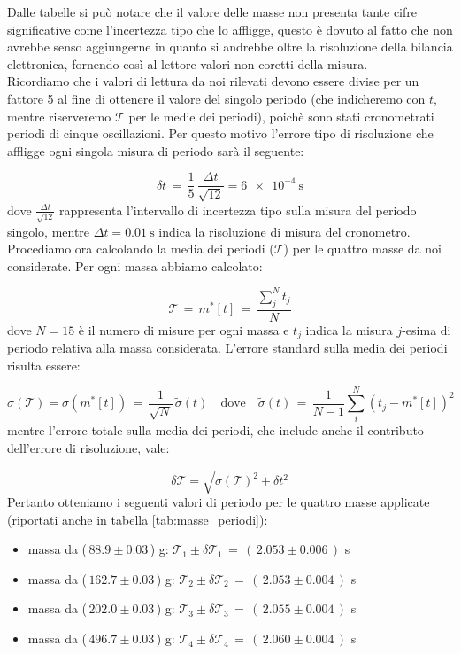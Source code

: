 Dalle tabelle si può notare che il valore delle masse non presenta tante cifre significative come l'incertezza tipo che lo affligge,
questo è dovuto al fatto che non avrebbe senso aggiungerne in quanto si andrebbe oltre la risoluzione della bilancia elettronica,
fornendo così al lettore valori non coretti della misura.\\

Ricordiamo che i valori di lettura da noi rilevati devono essere divise per un fattore 5 al fine di ottenere il valore del singolo periodo
(che indicheremo con $t$, mentre riserveremo $\mathcal{T}$ per le medie dei periodi), poichè sono stati  cronometrati periodi di cinque oscillazioni. Per questo motivo l'errore tipo di risoluzione che affligge ogni singola misura di periodo sarà il seguente:

\begin{equation*}
	\delta t \,=\, \frac{1}{5} \, \frac{\Delta t}{\sqrt{12}} = \SI{6e-4}{\second}
\end{equation*}
%
dove $\frac{\Delta t}{\sqrt{12}}$ rappresenta l'intervallo di incertezza tipo sulla misura del periodo singolo, mentre
$\Delta t = \SI{0.01}{\second}$ indica la risoluzione di misura del cronometro.\\
Procediamo ora calcolando la media dei periodi ($\mathcal{T}$) per le quattro masse da noi considerate. Per ogni massa
abbiamo calcolato:

\begin{equation*}
	\mathcal{T} \,=\, m^*[t] \,=\, \frac{\sum_{j}^{N} t_j}{N}
\end{equation*}
%
dove $N = 15$ è il numero di misure per ogni massa e $t_j$ indica la misura $j$-esima di periodo
relativa alla massa considerata. L'errore standard sulla media dei periodi risulta essere:

\begin{equation*}
    \sigma (\mathcal{T}) = \sigma(m^*[t]) \,=\, \frac{1}{\sqrt{N}} \, \tilde\sigma (t) \quad \text{dove} \quad \tilde\sigma(t)
    \,=\, \frac{1}{N-1} \sum_{i}^{N} (t_j - m^*[t])^2
\end{equation*}
%
mentre l'errore totale sulla media dei periodi, che include anche il contributo dell'errore di risoluzione, vale:

\begin{equation*}
    \delta \mathcal{T} = \sqrt{\sigma (\mathcal{T})^2 + \delta t^2}
\end{equation*}
%
Pertanto otteniamo i seguenti valori di periodo per le quattro masse applicate (riportati anche in tabella \ref{tab:masse_periodi}):
\begin{itemize}
	\item{ massa da ($\,88.9 \pm 0.03\,$) g: $\mathcal{T}_1 \pm \delta\mathcal{T}_1 \,=\, (\,2.053  \pm 0.006\,)$ s}
	\item{ massa da ($\,162.7 \pm 0.03\,$) g: $\mathcal{T}_2 \pm \delta\mathcal{T}_2 \,=\, (\,2.053 \pm 0.004\,)$ s}
	\item{ massa da ($\,202.0 \pm 0.03\,$) g: $\mathcal{T}_3 \pm \delta\mathcal{T}_3 \,=\, (\,2.055 \pm 0.004\,)$ s}
	\item{ massa da ($\,496.7 \pm 0.03\,$) g: $\mathcal{T}_4 \pm \delta\mathcal{T}_4 \,=\, (\,2.060 \pm 0.004\,)$ s}
\end{itemize}

